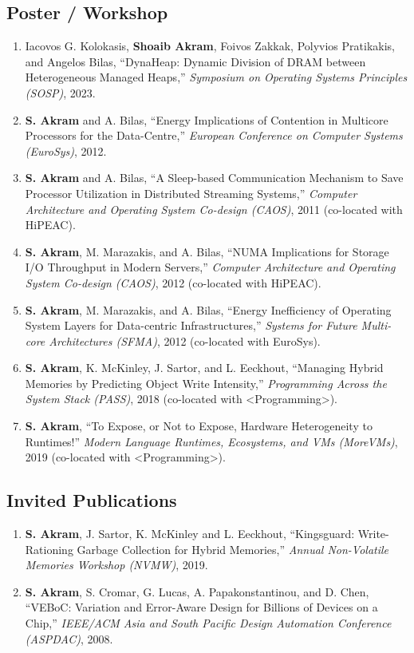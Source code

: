 \documentclass[11pt,a4paper,sans]{moderncv}
\begin{document}
\subsection{Poster / Workshop}
{\small
\begin{enumerate}
\item Iacovos G. Kolokasis, \textbf{Shoaib Akram}, Foivos Zakkak, Polyvios Pratikakis, and Angelos Bilas, ``DynaHeap: Dynamic Division of DRAM between Heterogeneous Managed Heaps,'' \emph{Symposium on Operating Systems Principles (SOSP)}, 2023.
\item \textbf{S. Akram} and A. Bilas, ``Energy Implications of Contention in Multicore Processors for the Data-Centre,'' \emph{European Conference on Computer Systems (EuroSys)}, 2012.
\item \textbf{S. Akram} and A. Bilas, ``A Sleep-based Communication Mechanism to Save Processor Utilization in Distributed Streaming Systems,'' \emph{Computer Architecture and Operating System Co-design (CAOS)}, 2011 (co-located with HiPEAC).
\item \textbf{S. Akram}, M. Marazakis, and A. Bilas, ``NUMA Implications for Storage I/O Throughput in Modern Servers,'' \emph{Computer Architecture and Operating System Co-design (CAOS)}, 2012 (co-located with HiPEAC). 
\item \textbf{S. Akram}, M. Marazakis, and A. Bilas, ``Energy Inefficiency of Operating System Layers for Data-centric Infrastructures,'' \emph{Systems for Future Multi-core Architectures (SFMA)}, 2012 (co-located with EuroSys).
\item \textbf{S. Akram}, K. McKinley, J. Sartor, and L. Eeckhout, ``Managing Hybrid Memories by Predicting Object Write Intensity,'' \emph{Programming Across the System Stack (PASS)}, 2018 (co-located with \textless Programming\textgreater). 
\item \textbf{S. Akram}, ``To Expose, or Not to Expose, Hardware Heterogeneity to Runtimes!'' \emph{Modern Language Runtimes, Ecosystems, and VMs (MoreVMs)}, 2019 (co-located with \textless Programming\textgreater).
\end{enumerate}
}

\subsection{Invited Publications}
{\small
\begin{enumerate}
\item \textbf{S. Akram}, J. Sartor, K. McKinley and L. Eeckhout, ``Kingsguard: Write-Rationing Garbage Collection for Hybrid Memories,'' \emph{Annual Non-Volatile Memories Workshop (NVMW)}, 2019. 
\item \textbf{S. Akram}, S. Cromar, G. Lucas, A. Papakonstantinou, and D. Chen, ``VEBoC: Variation and Error-Aware Design for Billions of Devices on a Chip,'' \emph{IEEE/ACM Asia and South Pacific Design Automation Conference (ASPDAC)}, 2008.
\end{enumerate}
}
\end{document}
